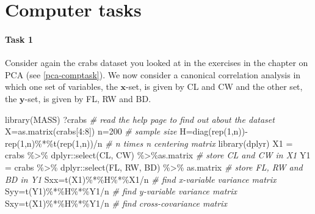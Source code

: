 \documentclass[
]{book}
\newenvironment{Shaded}{\begin{snugshade}}{\end{snugshade}}
\newcommand{\CommentTok}[1]{\textcolor[rgb]{0.56,0.35,0.01}{\textit{#1}}}
\newcommand{\DecValTok}[1]{\textcolor[rgb]{0.00,0.00,0.81}{#1}}
\newcommand{\FunctionTok}[1]{\textcolor[rgb]{0.00,0.00,0.00}{#1}}
\newcommand{\NormalTok}[1]{#1}
\newcommand{\OtherTok}[1]{\textcolor[rgb]{0.56,0.35,0.01}{#1}}
\newcommand{\SpecialCharTok}[1]{\textcolor[rgb]{0.00,0.00,0.00}{#1}}
\theoremstyle{definition}
\theoremstyle{definition}
\theoremstyle{definition}
\theoremstyle{definition}
\theoremstyle{remark}
\begin{document}
\hypertarget{computer-tasks-1}{%
\section{Computer tasks}\label{computer-tasks-1}}

\hypertarget{task-1}{%
\paragraph*{Task 1}\label{task-1}}

Consider again the crabs dataset you looked at in the exercises in the chapter on PCA (see \ref{pca-comptask}).
We now consider a canonical correlation analysis in which one set of variables, the \(\mathbf x\)-set, is given by CL and CW and the
other set, the \(\mathbf y\)-set, is given by FL, RW and BD.

\begin{Shaded}
\begin{Highlighting}[]
\FunctionTok{library}\NormalTok{(MASS)}
\NormalTok{?crabs           }\CommentTok{\# read the help page to find out about the dataset}
\NormalTok{X}\OtherTok{=}\FunctionTok{as.matrix}\NormalTok{(crabs[}\DecValTok{4}\SpecialCharTok{:}\DecValTok{8}\NormalTok{])    }
\NormalTok{n}\OtherTok{=}\DecValTok{200}                                      \CommentTok{\# sample size}
\NormalTok{H}\OtherTok{=}\FunctionTok{diag}\NormalTok{(}\FunctionTok{rep}\NormalTok{(}\DecValTok{1}\NormalTok{,n))}\SpecialCharTok{{-}}\FunctionTok{rep}\NormalTok{(}\DecValTok{1}\NormalTok{,n)}\SpecialCharTok{\%*\%}\FunctionTok{t}\NormalTok{(}\FunctionTok{rep}\NormalTok{(}\DecValTok{1}\NormalTok{,n))}\SpecialCharTok{/}\NormalTok{n  }
\CommentTok{\# n times n centering matrix}
\FunctionTok{library}\NormalTok{(dplyr)}
\NormalTok{X1 }\OtherTok{=}\NormalTok{ crabs }\SpecialCharTok{\%\textgreater{}\%}\NormalTok{ dplyr}\SpecialCharTok{::}\FunctionTok{select}\NormalTok{(CL, CW)  }\SpecialCharTok{\%\textgreater{}\%}\NormalTok{as.matrix            }
\CommentTok{\# store CL and CW in X1}
\NormalTok{Y1 }\OtherTok{=}\NormalTok{ crabs }\SpecialCharTok{\%\textgreater{}\%}\NormalTok{ dplyr}\SpecialCharTok{::}\FunctionTok{select}\NormalTok{(FL, RW, BD) }\SpecialCharTok{\%\textgreater{}\%}\NormalTok{ as.matrix            }
\CommentTok{\# store FL, RW and BD in Y1}
\NormalTok{Sxx}\OtherTok{=}\FunctionTok{t}\NormalTok{(X1)}\SpecialCharTok{\%*\%}\NormalTok{H}\SpecialCharTok{\%*\%}\NormalTok{X1}\SpecialCharTok{/}\NormalTok{n       }\CommentTok{\# find x{-}variable variance matrix}
\NormalTok{Syy}\OtherTok{=}\FunctionTok{t}\NormalTok{(Y1)}\SpecialCharTok{\%*\%}\NormalTok{H}\SpecialCharTok{\%*\%}\NormalTok{Y1}\SpecialCharTok{/}\NormalTok{n       }\CommentTok{\# find y{-}variable variance matrix}
\NormalTok{Sxy}\OtherTok{=}\FunctionTok{t}\NormalTok{(X1)}\SpecialCharTok{\%*\%}\NormalTok{H}\SpecialCharTok{\%*\%}\NormalTok{Y1}\SpecialCharTok{/}\NormalTok{n       }\CommentTok{\# find cross{-}covariance matrix}
\end{Highlighting}
\end{Shaded}
\end{document}
